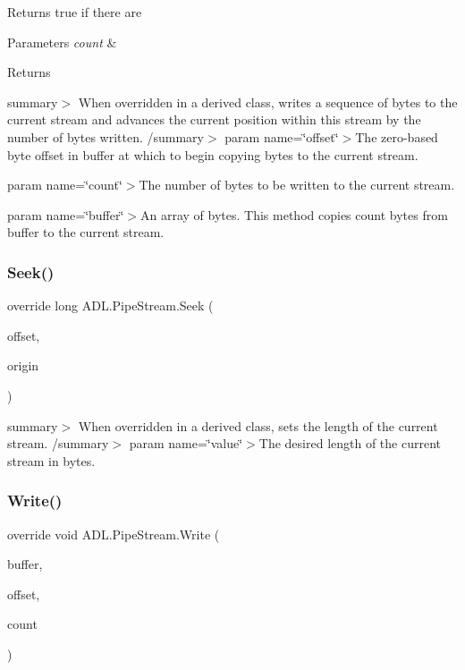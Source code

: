 Returns true if there are 


\begin{DoxyParams}{Parameters}
{\em count} & \\
\hline
\end{DoxyParams}
\begin{DoxyReturn}{Returns}

\end{DoxyReturn}
summary$>$ When overridden in a derived class, writes a sequence of bytes to the current stream and advances the current position within this stream by the number of bytes written. /summary$>$ param name=\char`\"{}offset\char`\"{}$>$The zero-\/based byte offset in buffer at which to begin copying bytes to the current stream. 

param name=\char`\"{}count\char`\"{}$>$The number of bytes to be written to the current stream. 

param name=\char`\"{}buffer\char`\"{}$>$An array of bytes. This method copies count bytes from buffer to the current stream. \mbox{\label{class_a_d_l_1_1_pipe_stream_ae34adb2842a65053e2e13dcb15fe65e5}} 
\subsubsection{\texorpdfstring{Seek()}{Seek()}}
{\footnotesize\ttfamily override long A\+D\+L.\+Pipe\+Stream.\+Seek (\begin{DoxyParamCaption}\item[{long}]{offset,  }\item[{Seek\+Origin}]{origin }\end{DoxyParamCaption})}

summary$>$ When overridden in a derived class, sets the length of the current stream. /summary$>$ param name=\char`\"{}value\char`\"{}$>$The desired length of the current stream in bytes. \mbox{\label{class_a_d_l_1_1_pipe_stream_a5f8e6e0a0b7070fc2e5320d2007eadd1}} 
\subsubsection{\texorpdfstring{Write()}{Write()}}
{\footnotesize\ttfamily override void A\+D\+L.\+Pipe\+Stream.\+Write (\begin{DoxyParamCaption}\item[{byte \mbox{[}$\,$\mbox{]}}]{buffer,  }\item[{int}]{offset,  }\item[{int}]{count }\end{DoxyParamCaption})}

